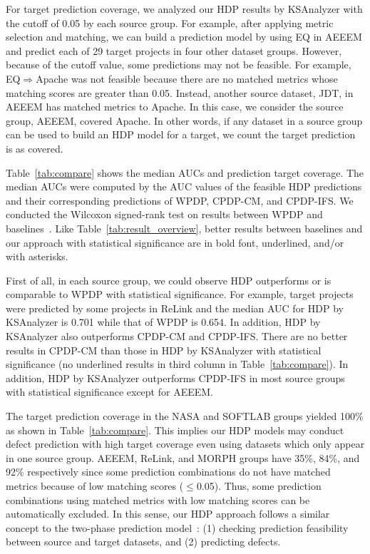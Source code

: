 \begin{table}[t]
\begin{tabular}{|c|@{ }c@{ }|@{ }c@{ }|@{ }c@{ }|@{ }c@{ }||c|}


\end{tabular}
\end{table}
For target prediction coverage, we analyzed our HDP results by KSAnalyzer with
the cutoff of 0.05 by each source group. For example, after applying
metric selection and matching, we can build a prediction model by using EQ in
AEEEM and predict each of 29 target projects in four other dataset
groups. However, because of the cutoff value, some predictions may not be
feasible. For example, EQ$\Rightarrow$Apache was not feasible because there are
no matched metrics whose matching scores are greater than 0.05.
Instead, another source dataset, JDT, in AEEEM has
matched metrics to Apache. In this case, we consider
the source group, AEEEM, covered Apache. In other words, if
any dataset in a source group can be used to build an HDP model for a target, we
count the target prediction is as covered.

Table~\ref{tab:compare} shows the median AUCs and
prediction target coverage. The median AUCs were computed by the AUC
values of the feasible HDP predictions and their corresponding predictions of
WPDP, CPDP-CM, and CPDP-IFS. We conducted the Wilcoxon
signed-rank test on results between WPDP and baselines~\cite{Wilcoxon45}. Like
Table~\ref{tab:result_overview}, better results between baselines and our
approach with statistical significance are in bold font, underlined, and/or with
asterisks.%

First of all, in each source group, we could observe HDP outperforms or is
comparable to WPDP with statistical significance.
For example, target projects were predicted by some projects in ReLink and
the median AUC for HDP by KSAnalyzer is 0.701 while that of
WPDP is 0.654. In addition,
HDP by KSAnalyzer also
outperforms CPDP-CM and CPDP-IFS.
There are no better results in CPDP-CM
than those in HDP by KSAnalyzer with statistical significance (no
underlined results in third column in Table~\ref{tab:compare}). In addition, HDP
by KSAnalyzer outperforms CPDP-IFS in most source groups with statistical significance except for AEEEM.

The target prediction coverage in the NASA and SOFTLAB groups yielded 100\% as
shown in Table~\ref{tab:compare}. This implies our HDP models may conduct defect
prediction with high target coverage even using datasets which only appear in
one source group. AEEEM, ReLink, and MORPH groups have 35\%, 84\%, and 92\% respectively
since some prediction combinations do not have matched metrics because of low matching scores ($\leq$0.05).
Thus, some prediction combinations
using matched metrics with low matching scores can be automatically excluded. In
this sense, our HDP approach follows a similar concept to the two-phase
prediction model~\cite{Kim13}: (1) checking prediction feasibility between
source and target datasets, and (2) predicting defects.


